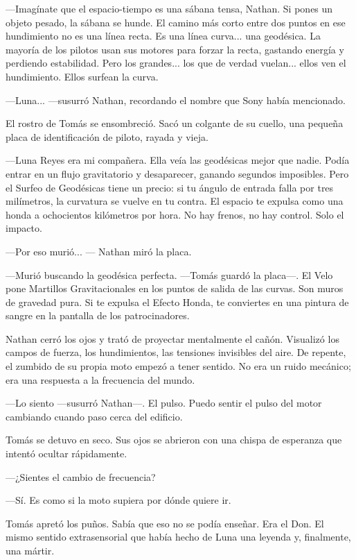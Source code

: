 \documentclass[11pt,twoside]{book}
\begin{document}
---Imagínate que el espacio-tiempo es una sábana tensa, Nathan. Si pones un objeto pesado, la sábana se hunde. El camino más corto entre dos puntos en ese hundimiento no es una línea recta. Es una línea curva... una geodésica. La mayoría de los pilotos usan sus motores para forzar la recta, gastando energía y perdiendo estabilidad. Pero los grandes... los que de verdad vuelan... ellos ven el hundimiento. Ellos surfean la curva.

---Luna... ---susurró Nathan, recordando el nombre que Sony había mencionado.

El rostro de Tomás se ensombreció. Sacó un colgante de su cuello, una pequeña placa de identificación de piloto, rayada y vieja.

---Luna Reyes era mi compañera. Ella veía las geodésicas mejor que nadie. Podía entrar en un flujo gravitatorio y desaparecer, ganando segundos imposibles. Pero el Surfeo de Geodésicas tiene un precio: si tu ángulo de entrada falla por tres milímetros, la curvatura se vuelve en tu contra. El espacio te expulsa como una honda a ochocientos kilómetros por hora. No hay frenos, no hay control. Solo el impacto.

---Por eso murió... --- Nathan miró la placa.

---Murió buscando la geodésica perfecta. ---Tomás guardó la placa---. El Velo pone Martillos Gravitacionales en los puntos de salida de las curvas. Son muros de gravedad pura. Si te expulsa el Efecto Honda, te conviertes en una pintura de sangre en la pantalla de los patrocinadores.

Nathan cerró los ojos y trató de proyectar mentalmente el cañón. Visualizó los campos de fuerza, los hundimientos, las tensiones invisibles del aire. De repente, el zumbido de su propia moto empezó a tener sentido. No era un ruido mecánico; era una respuesta a la frecuencia del mundo.

---Lo siento ---susurró Nathan---. El pulso. Puedo sentir el pulso del motor cambiando cuando paso cerca del edificio.

Tomás se detuvo en seco. Sus ojos se abrieron con una chispa de esperanza que intentó ocultar rápidamente.

---¿Sientes el cambio de frecuencia?

---Sí. Es como si la moto supiera por dónde quiere ir.

Tomás apretó los puños. Sabía que eso no se podía enseñar. Era el Don. El mismo sentido extrasensorial que había hecho de Luna una leyenda y, finalmente, una mártir.
\end{document}
